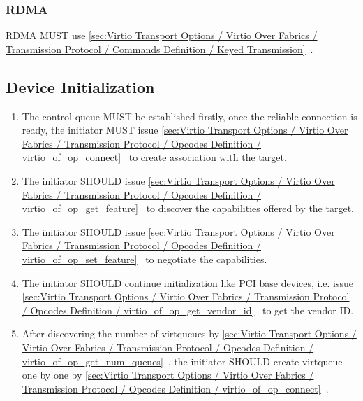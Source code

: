 \subsubsection{RDMA}\label{sec:Virtio Transport Options / Virtio Over Fabrics / ransport Binding / RDMA}
RDMA MUST use \ref{sec:Virtio Transport Options / Virtio Over Fabrics / Transmission Protocol / Commands Definition / Keyed Transmission}~.

\subsection{Device Initialization}\label{sec:Virtio Transport Options / Virtio Over Fabrics / Device Initialization}
\begin{enumerate}
\item The control queue MUST be established firstly, once the reliable connection is ready, the initiator MUST issue \ref{sec:Virtio Transport Options / Virtio Over Fabrics / Transmission Protocol / Opcodes Definition / virtio_of_op_connect}~ to create association with the target.
\item The initiator SHOULD issue \ref{sec:Virtio Transport Options / Virtio Over Fabrics / Transmission Protocol / Opcodes Definition / virtio_of_op_get_feature}~ to discover the capabilities offered by the target.
\item The initiator SHOULD issue \ref{sec:Virtio Transport Options / Virtio Over Fabrics / Transmission Protocol / Opcodes Definition / virtio_of_op_set_feature}~ to negotiate the capabilities.
\item The initiator SHOULD continue initialization like PCI base devices, i.e. issue \ref{sec:Virtio Transport Options / Virtio Over Fabrics / Transmission Protocol / Opcodes Definition / virtio_of_op_get_vendor_id}~ to get the vendor ID.
\item After discovering the number of virtqueues by \ref{sec:Virtio Transport Options / Virtio Over Fabrics / Transmission Protocol / Opcodes Definition / virtio_of_op_get_num_queues}~, the initiator SHOULD create virtqueue one by one by \ref{sec:Virtio Transport Options / Virtio Over Fabrics / Transmission Protocol / Opcodes Definition / virtio_of_op_connect}~.

\end{enumerate}
